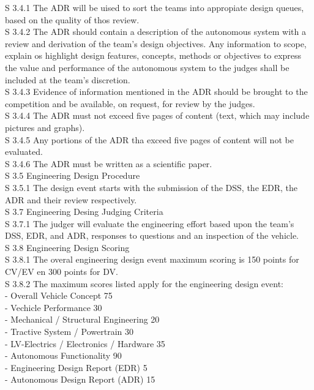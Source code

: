 \documentclass{article}
\begin{document}
S 3.4.1 The ADR will be uised to sort the teams into appropiate design queues, based on the quality of thos review.\\

S 3.4.2 The ADR should contain a description of the autonomous system with a review and derivation of the team's design objectives. Any information to scope, explain os highlight design features, concepts, methods or objectives to express the value and performance of the autonomous system to the judges shall be included at the team's discretion.\\

S 3.4.3 Evidence of information mentioned in the ADR should be brought to the competition and be available, on request, for review by the judges.\\

S 3.4.4 The ADR must not exceed five pages of content (text, which may include pictures and graphs).\\

S 3.4.5 Any portions of the ADR tha exceed five pages of content will not be evaluated.\\

S 3.4.6 The ADR must be written as a scientific paper.\\

S 3.5 Engineering Design Procedure\\

S 3.5.1 The design event starts with the submission of the DSS, the EDR, the ADR and their review respectively.\\

S 3.7 Engineering Desing Judging Criteria\\

S 3.7.1 The judger will evaluate the engineering effort based upon the team's DSS, EDR, and ADR, responses to questions and an inspection of the vehicle.\\

S 3.8 Engineering Design Scoring\\

S 3.8.1 The overal engineering design event maximum scoring is 150 points for CV/EV en 300 points for DV.\\

S 3.8.2 The maximum scores listed apply for the engineering design event:\\
	- Overall Vehicle Concept				75\\
	- Vechicle Performance					30\\
	- Mechanical / Structural Engineering	20\\
	- Tractive System / Powertrain			30\\
	- LV-Electrics / Electronics / Hardware	35\\
	- Autonomous Functionality				90\\
	- Engineering Design Report (EDR)		5\\
	- Autonomous Design Report (ADR)		15\\
\end{document}
